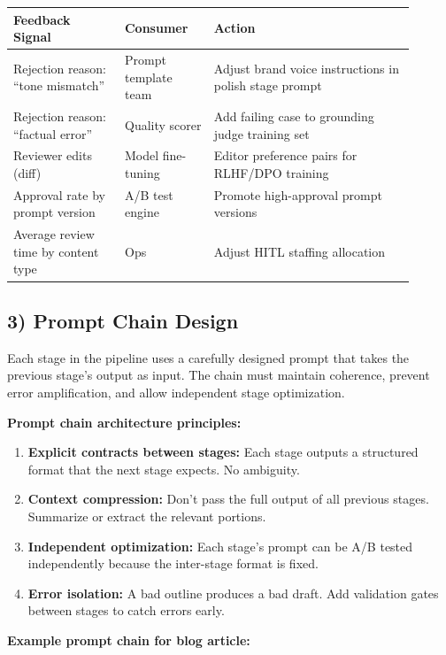 \begin{tabular}{|p{0.25\linewidth}|p{0.20\linewidth}|p{0.45\linewidth}|}
\hline
\textbf{Feedback Signal} & \textbf{Consumer} & \textbf{Action} \\
\hline
Rejection reason: ``tone mismatch'' & Prompt template team & Adjust brand voice instructions in polish stage prompt \\
\hline
Rejection reason: ``factual error'' & Quality scorer & Add failing case to grounding judge training set \\
\hline
Reviewer edits (diff) & Model fine-tuning & Editor preference pairs for RLHF/DPO training \\
\hline
Approval rate by prompt version & A/B test engine & Promote high-approval prompt versions \\
\hline
Average review time by content type & Ops & Adjust HITL staffing allocation \\
\hline
\end{tabular}

\subsection*{3) Prompt Chain Design}

Each stage in the pipeline uses a carefully designed prompt that takes the previous stage's output as input. The chain must maintain coherence, prevent error amplification, and allow independent stage optimization.

\textbf{Prompt chain architecture principles:}

\begin{enumerate}
  \item \textbf{Explicit contracts between stages:} Each stage outputs a structured format that the next stage expects. No ambiguity.
  \item \textbf{Context compression:} Don't pass the full output of all previous stages. Summarize or extract the relevant portions.
  \item \textbf{Independent optimization:} Each stage's prompt can be A/B tested independently because the inter-stage format is fixed.
  \item \textbf{Error isolation:} A bad outline produces a bad draft. Add validation gates between stages to catch errors early.
\end{enumerate}

\textbf{Example prompt chain for blog article:}

